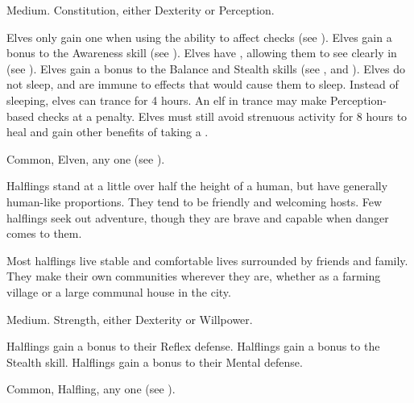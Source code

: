    Medium.
    Constitution, either  Dexterity or  Perception.
  \begin{raggeditemize}
     Elves only gain one  when using the  ability to affect checks (see ).
     Elves gain a  bonus to the Awareness skill (see ).
     Elves have , allowing them to see clearly in  (see ).
     Elves gain a  bonus to the Balance and Stealth skills (see , and ).
     Elves do not sleep, and are immune to \magical effects that would cause them to sleep.
      Instead of sleeping, elves can trance for 4 hours.
      An elf in trance may make Perception-based checks at a  penalty.
      Elves must still avoid strenuous activity for 8 hours to heal and gain other benefits of taking a .
  \end{raggeditemize}
   Common, Elven, any one  (see ).


  Halflings stand at a little over half the height of a human, but have generally human-like proportions.
  They tend to be friendly and welcoming hosts.
  Few halflings seek out adventure, though they are brave and capable when danger comes to them.

  Most halflings live stable and comfortable lives surrounded by friends and family.
  They make their own communities wherever they are, whether as a farming village or a large communal house in the city.

   Medium.
    Strength, either  Dexterity or  Willpower.
  \begin{raggeditemize}
     Halflings gain a  bonus to their Reflex defense.
     Halflings gain a  bonus to the Stealth skill.
     Halflings gain a  bonus to their Mental defense.
  \end{raggeditemize}
   Common, Halfling, any one  (see ).

